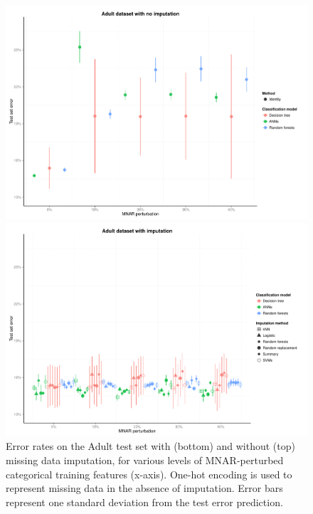 \documentclass[10pt]{book}
\theoremstyle{definition}
\begin{document}
\begin{figure}[h!]
\includegraphics [scale=0.45]{figure/test-errors-adult-no-imp.pdf}\par
\includegraphics [scale=0.45]{figure/test-errors-adult-imp.pdf}\par
   \caption{\footnotesize Error rates on the Adult test set with (bottom) and without (top) missing data imputation, for various levels of MNAR-perturbed categorical training features (x-axis). One-hot encoding is used to represent missing data in the absence of imputation. Error bars represent one standard deviation from the test error prediction.}
   \label{fig:test-error-adult}
\end{figure}
\end{document}
